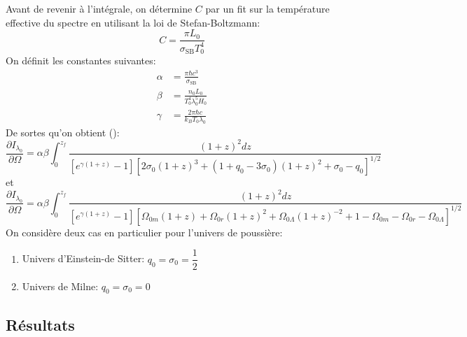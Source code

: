\documentclass{article}
\numberwithin{equation}{section}
\begin{document}
Avant de revenir à l'intégrale,
on détermine $C$ par un fit sur la température effective du spectre en utilisant la loi de 
Stefan-Boltzmann:
\[
        C = \frac{\pi L_0}{\sigma_{\text{SB}}T^4_0}
\]
On définit les constantes suivantes:
\begin{align*}
        \alpha &=  \frac{\pi \hbar c^3}{\sigma_{\text{SB}}}  \\
        \beta &= \frac{n_0 L_0}{T_0^4 \lambda_0^5H_0} \\
        \gamma &= \frac{2\pi \hbar c }{k_B T_0 \lambda_0}
\end{align*}
De sortes qu'on obtient (\cite{Wesson1991}):
\[ 
        \frac{\partial I_{\lambda_0}}{\partial \Omega} = \alpha \beta 
        \int_0^{z_f} \frac{(1 + z)^{2}dz}{[e^{\gamma(1 + z)} - 1][2 \sigma_0(1 + z)^{3} + 
        (1 + q_0 - 3\sigma_0)(1 + z)^{2}  + \sigma_0 - q_0]^{1/2}}
\]
et
\[
        \frac{\partial I_{\lambda_0}}{\partial \Omega} = \alpha \beta 
        \int_0^{z_f} \frac{(1 + z)^{2}dz}{[e^{\gamma(1 + z)} - 1][\Omega_{0m}(1 + z) 
        + \Omega_{0r}(1 + z)^{2} + \Omega_{0\Lambda}(1 + z)^{-2}
+ 1 - \Omega_{0m} - \Omega_{0r} - \Omega_{0\Lambda}]^{1/2}}
\]
On considère deux cas en particulier pour l'univers de poussière:
\begin{enumerate}
        \item Univers d'Einstein-de Sitter: $q_0 = \sigma_0 = \dfrac{1}{2}$
        \item Univers de Milne: $q_0 = \sigma_0 = 0$        
\end{enumerate}

\subsection{Résultats}
\end{document}
